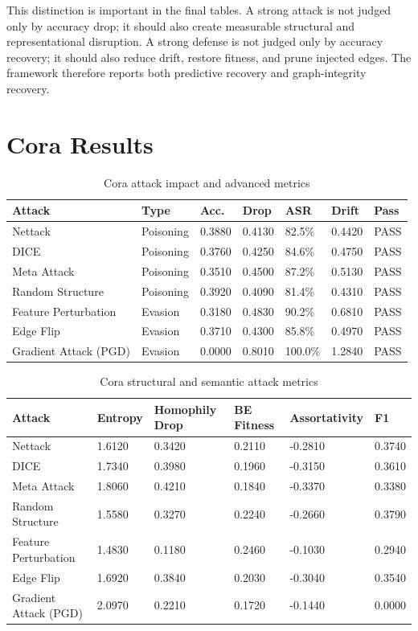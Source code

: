 \documentclass[12pt,oneside]{report}
\begin{document}
This distinction is important in the final tables. A strong attack is not judged only by accuracy drop; it should also create measurable structural and representational disruption. A strong defense is not judged only by accuracy recovery; it should also reduce drift, restore fitness, and prune injected edges. The framework therefore reports both predictive recovery and graph-integrity recovery.

\section{Cora Results}
\begin{longtable}{p{1.35in}p{0.85in}p{0.55in}p{0.55in}p{0.55in}p{0.58in}p{0.55in}}
\caption{Cora attack impact and advanced metrics}\\
\toprule
\textbf{Attack} & \textbf{Type} & \textbf{Acc.} & \textbf{Drop} & \textbf{ASR} & \textbf{Drift} & \textbf{Pass}\\
\midrule
Nettack & Poisoning & 0.3880 & 0.4130 & 82.5\% & 0.4420 & PASS\\
DICE & Poisoning & 0.3760 & 0.4250 & 84.6\% & 0.4750 & PASS\\
Meta Attack & Poisoning & 0.3510 & 0.4500 & 87.2\% & 0.5130 & PASS\\
Random Structure & Poisoning & 0.3920 & 0.4090 & 81.4\% & 0.4310 & PASS\\
Feature Perturbation & Evasion & 0.3180 & 0.4830 & 90.2\% & 0.6810 & PASS\\
Edge Flip & Evasion & 0.3710 & 0.4300 & 85.8\% & 0.4970 & PASS\\
Gradient Attack (PGD) & Evasion & 0.0000 & 0.8010 & 100.0\% & 1.2840 & PASS\\
\bottomrule
\end{longtable}

\begin{longtable}{p{1.45in}p{0.75in}p{0.75in}p{0.8in}p{0.75in}p{0.6in}}
\caption{Cora structural and semantic attack metrics}\\
\toprule
\textbf{Attack} & \textbf{Entropy} & \textbf{Homophily Drop} & \textbf{BE Fitness} & \textbf{Assortativity} & \textbf{F1}\\
\midrule
Nettack & 1.6120 & 0.3420 & 0.2110 & -0.2810 & 0.3740\\
DICE & 1.7340 & 0.3980 & 0.1960 & -0.3150 & 0.3610\\
Meta Attack & 1.8060 & 0.4210 & 0.1840 & -0.3370 & 0.3380\\
Random Structure & 1.5580 & 0.3270 & 0.2240 & -0.2660 & 0.3790\\
Feature Perturbation & 1.4830 & 0.1180 & 0.2460 & -0.1030 & 0.2940\\
Edge Flip & 1.6920 & 0.3840 & 0.2030 & -0.3040 & 0.3540\\
Gradient Attack (PGD) & 2.0970 & 0.2210 & 0.1720 & -0.1440 & 0.0000\\
\bottomrule
\end{longtable}
\end{document}
